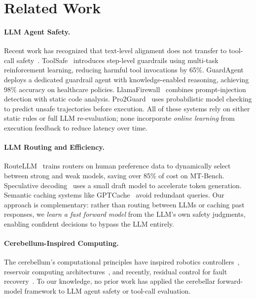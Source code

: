 \documentclass[11pt,a4paper]{article}
\begin{document}
\section{Related Work}\label{sec:related}

\paragraph{LLM Agent Safety.}
Recent work has recognized that text-level alignment does not transfer to tool-call safety~\citep{xiang2026mindgap}.
ToolSafe~\citep{chen2025toolsafe} introduces step-level guardrails using multi-task reinforcement learning, reducing harmful tool invocations by 65\%.
GuardAgent~\citep{xiang2024guardagent} deploys a dedicated guardrail agent with knowledge-enabled reasoning, achieving 98\% accuracy on healthcare policies.
LlamaFirewall~\citep{meta2025llamafirewall} combines prompt-injection detection with static code analysis.
Pro2Guard~\citep{zheng2025pro2guard} uses probabilistic model checking to predict unsafe trajectories before execution.
All of these systems rely on either static rules or full LLM re-evaluation; none incorporate \emph{online learning} from execution feedback to reduce latency over time.

\paragraph{LLM Routing and Efficiency.}
RouteLLM~\citep{ong2024routellm} trains routers on human preference data to dynamically select between strong and weak models, saving over 85\% of cost on MT-Bench.
Speculative decoding~\citep{leviathan2023speculative} uses a small draft model to accelerate token generation.
Semantic caching systems like GPTCache~\citep{bang2023gptcache} avoid redundant queries.
Our approach is complementary: rather than routing between LLMs or caching past responses, we \emph{learn a fast forward model} from the LLM's own safety judgments, enabling confident decisions to bypass the LLM entirely.

\paragraph{Cerebellum-Inspired Computing.}
The cerebellum's computational principles have inspired robotics controllers~\citep{porrill2013cerebellum}, reservoir computing architectures~\citep{pinzon2019forward}, and recently, residual control for fault recovery~\citep{wang2025cerebellar}.
To our knowledge, no prior work has applied the cerebellar forward-model framework to LLM agent safety or tool-call evaluation.
\end{document}
